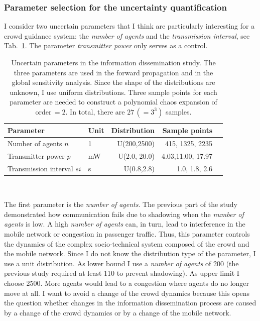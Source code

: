 \subsubsection{Parameter selection for the uncertainty quantification}
I consider two uncertain parameters that I think are particularly interesting for a crowd guidance system: the \textit{number of agents} and the \textit{transmission interval}, see Tab.~\ref{tab:parameterstudy1}. The parameter \textit{transmitter power} only serves as a control. 

\begin{table}[hbt!]
\centering
\begin{tabular}{@{}llrrl@{}}%
\toprule
Parameter                        & Unit & Distribution & Sample points                                  \\ \midrule
Number of agents $n$ & 1    & U(200,2500) & 415, 1325, 2235    \\
Transmitter power $p$      & mW   & U(2.0, 20.0) & 4.03,11.00, 17.97     \\
Transmission interval $si$        & s   & U(0.8,2.8)   & 1.0, 1.8, 2.6       \\
\bottomrule
\end{tabular}%
\\ \vspace{0.3cm}
\caption[Uncertain parameters in the information dissemination study]{Uncertain parameters in the information dissemination study. The three parameters are used in the forward propagation and in the global sensitivity analysis. Since the shape of the distributions are unknown, I use uniform distributions.   Three sample points for each parameter are needed to construct a polynomial chaos expansion of order\,$=2$. In total, there are $27\,(=3^3)$ samples.   }%
\label{tab:parameterstudy1}%
\end{table}%

The first parameter is the \textit{number of agents}. The previous part of the study demonstrated how communication fails due to shadowing when the \textit{number of agents} is low. A high \textit{number of agents} can, in turn, lead to interference in the mobile network or congestion in passenger traffic. Thus, this parameter controls the dynamics of  the complex socio-technical system composed of the crowd and the mobile network. Since I do not know the distribution type of the parameter, I use a unit distribution. As lower bound I use a \textit{number of agents} of 200 (the previous study required at least  110 to prevent shadowing). As upper limit I choose 2500.  More agents would lead to a congestion where agents do no longer move at all. I want to avoid a change of the crowd dynamics because this opens the question whether changes in the information dissemination process are caused by a change of the crowd dynamics or by a change of the mobile network.  

